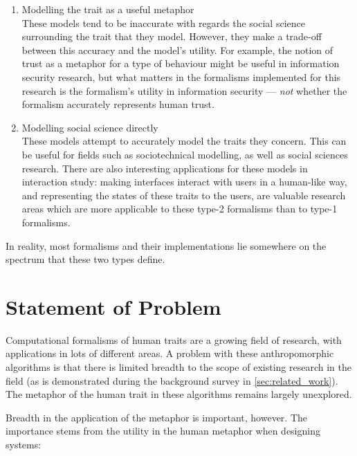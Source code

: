 \begin{enumerate}
    \item Modelling the trait as a useful metaphor\\
    These models tend to be inaccurate with regards the social science surrounding the trait that they model. However, they make a trade-off between this accuracy and the model's utility. For example, the notion of trust as a metaphor for a type of behaviour might be useful in information security research, but what matters in the formalisms implemented for this research is the formalism's utility in information security --- \emph{not} whether the formalism accurately represents human trust.
    \item Modelling social science directly\\
    These models attempt to accurately model the traits they concern. This can be useful for fields such as sociotechnical modelling, as well as social sciences research. There are also interesting applications for these models in interaction study: making interfaces interact with users in a human-like way, and representing the states of these traits to the users, are valuable research areas which are more applicable to these type-2 formalisms than to type-1 formalisms.
\end{enumerate}

In reality, most formalisms and their implementations lie somewhere on the spectrum that these two types define.

\section{Statement of Problem}
Computational formalisms of human traits are a growing field of research, with applications in lots of different areas. A problem with these anthropomorphic algorithms is that there is limited breadth to the scope of existing research in the field (as is demonstrated during the background survey in \cref{sec:related_work}). The metaphor of the human trait in these algorithms remains largely unexplored.\par

Breadth in the application of the metaphor is important, however. The importance stems from the utility in the human metaphor when designing systems:

